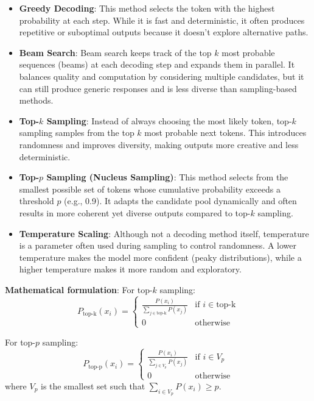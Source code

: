 \begin{itemize}
	\item \textbf{Greedy Decoding}: This method selects the token with the highest probability at each step. While it is fast and deterministic, it often produces repetitive or suboptimal outputs because it doesn't explore alternative paths.
	\item \textbf{Beam Search}: Beam search keeps track of the top \(k\) most probable sequences (beams) at each decoding step and expands them in parallel. It balances quality and computation by considering multiple candidates, but it can still produce generic responses and is less diverse than sampling-based methods.
	\item \textbf{Top-\(k\) Sampling}: Instead of always choosing the most likely token, top-\(k\) sampling samples from the top \(k\) most probable next tokens. This introduces randomness and improves diversity, making outputs more creative and less deterministic.
	\item \textbf{Top-\(p\) Sampling (Nucleus Sampling)}: This method selects from the smallest possible set of tokens whose cumulative probability exceeds a threshold \(p\) (e.g., 0.9). It adapts the candidate pool dynamically and often results in more coherent yet diverse outputs compared to top-\(k\) sampling.
	\item \textbf{Temperature Scaling}: Although not a decoding method itself, temperature is a parameter often used during sampling to control randomness. A lower temperature makes the model more confident (peaky distributions), while a higher temperature makes it more random and exploratory.
\end{itemize}

\textbf{Mathematical formulation}:
For top-\(k\) sampling:
\[
P_{\text{top-k}}(x_i) = \begin{cases}
\frac{P(x_i)}{\sum_{j \in \text{top-k}} P(x_j)} & \text{if } i \in \text{top-k} \\
0 & \text{otherwise}
\end{cases}
\]

For top-\(p\) sampling:
\[
P_{\text{top-p}}(x_i) = \begin{cases}
\frac{P(x_i)}{\sum_{j \in V_p} P(x_j)} & \text{if } i \in V_p \\
0 & \text{otherwise}
\end{cases}
\]
where \(V_p\) is the smallest set such that \(\sum_{i \in V_p} P(x_i) \geq p\).

